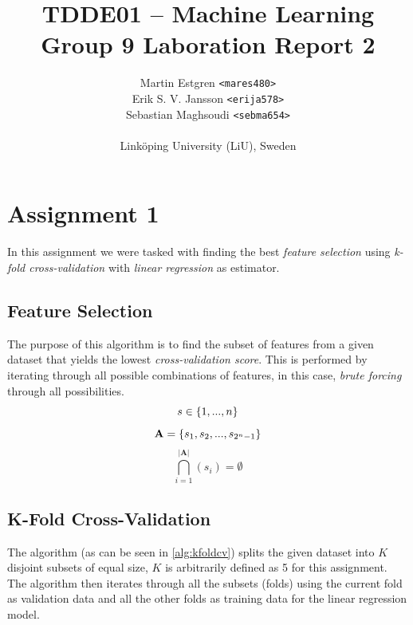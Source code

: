 \documentclass[a4paper, twocolumn]{article}
\title{TDDE01 -- Machine Learning \\
       Group 9 Laboration Report 2}
\author{{Martin Estgren \texttt{<mares480>}} \\
        {Erik S. V. Jansson \texttt{<erija578>}} \\
        {Sebastian Maghsoudi \texttt{<sebma654>}} \\~\\
        {Linköping University (LiU), Sweden}}
\begin{document}
    \maketitle %

    \section*{Assignment 1}

        In this assignment we were tasked with finding the best \emph{feature selection} using \emph{k-fold cross-validation} with \emph{linear regression} as estimator.

        \subsection*{Feature Selection}

        The purpose of this algorithm is to find the subset of features from a given dataset that yields the lowest \emph{cross-validation score}. This is performed by iterating through all possible combinations of features, in this case, \emph{brute forcing} through all possibilities.
        \begin{equation}
            s \in \{1,...,n\}\\
        \end{equation}
        \begin{equation}
            \mathbf{A} = \{s_1,s_2,...,s_{2^n-1}\}\\
        \end{equation}
        \begin{equation}
            \bigcap_{i = 1}^{|\mathbf{A}|}{(s_i)} = \emptyset
        \end{equation}

        \subsection*{K-Fold Cross-Validation}

            The algorithm (as can be seen in \ref{alg:kfoldcv}) splits the given dataset into \( K \) disjoint subsets of equal size, \( K \) is arbitrarily defined as 5 for this assignment. The algorithm then iterates through all the subsets (folds) using the current fold as validation data and all the other folds as training data for the linear regression model.
\end{document}
